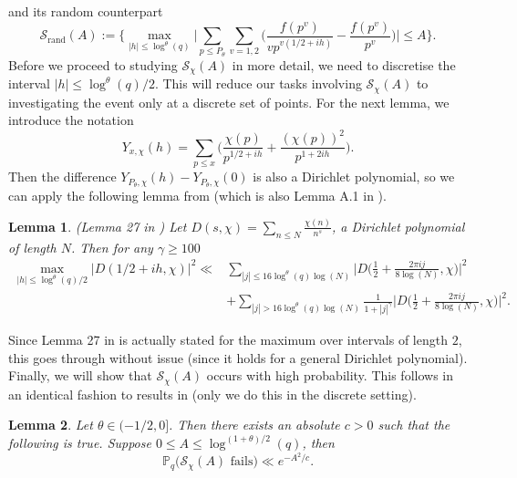 \documentclass[10pt,a4paper]{amsart}
\newtheorem{lemma}{Lemma}
\numberwithin{equation}{section}
\begin{document}
and its random counterpart
\begin{equation}
    \mathcal{S}_{\text{rand}}(A) :=\big\{\max_{|h| \leq \log^{\theta}(q)}\big|\sum_{p \leq P_\theta}\sum_{v=1,2}\big(\frac{f(p^v)}{vp^{v(1/2+ih)}}-\frac{f(p^v)}{p^{v}}\big) \big| \leq A\big\}. \label{central_rand_shift}
\end{equation}
Before we proceed to studying $\mathcal{S}_\chi(A)$ in more detail, we need to discretise the interval $|h| \leq \log^{\theta}(q)/2$. This will reduce our tasks involving $\mathcal{S}_\chi(A)$ to investigating the event only at a discrete set of points. For the next lemma, we introduce the notation
$$Y_{x,\chi}(h) = \sum_{p \leq x}\big(\frac{\chi(p)}{p^{1/2+ih}}+\frac{(\chi(p))^2}{p^{1+2ih}}\big).$$ Then the difference $Y_{P_\theta,\chi}(h)-Y_{P_\theta,\chi}(0)$ is also a Dirichlet polynomial, so we can apply the following lemma from \cite{abr20} (which is also Lemma A.1 in \cite{ah24}).
\begin{lemma}
    (Lemma 27 in \cite{abr20}) Let $D(s,\chi) = \sum_{n \leq N}\frac{\chi(n)}{n^s}$, a Dirichlet polynomial of length $N$. Then for any $\gamma \geq 100$
    \begin{equation*}\begin{split}\max_{|h| \leq \log^\theta(q)/2}|D(1/2+ih,\chi)|^2 \ll&\sum_{|j| \leq 16\log^\theta(q)\log(N)}\big|D\big(\frac{1}{2}+\frac{2\pi i j}{8\log(N)},\chi \big)\big|^2 \\
    &+ \sum_{|j| > 16\log^\theta(q)\log(N)}\frac{1}{1+|j|^\gamma}\big|D\big(\frac{1}{2}+\frac{2\pi i j}{8\log(N)},\chi \big)\big|^2.\end{split}
    \end{equation*}
\end{lemma}
Since Lemma 27 in \cite{abr20} is actually stated for the maximum over intervals of length $2$, this goes through without issue (since it holds for a general Dirichlet polynomial). Finally, we will show that $\mathcal{S}_\chi(A)$ occurs with high probability. This follows in an identical fashion to results in \cite{ah24} (only we do this in the discrete setting).
\begin{lemma}
    Let $\theta \in (-1/2,0]$. Then there exists an absolute $c>0$ such that the following is true. Suppose $0 \leq A\leq \log^{(1+\theta)/2}(q)$, then
    $$\mathbb{P}_q\big(\mathcal{S}_\chi(A) \text{ fails}\big) \ll e^{-A^2/c}.$$ \label{char_chaining}
\end{lemma}
\end{document}
